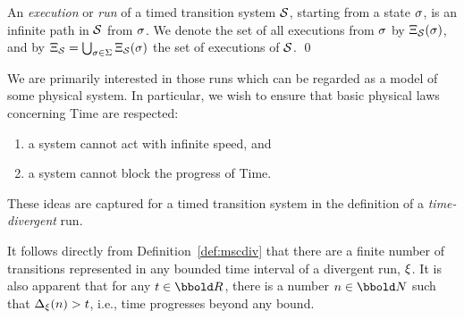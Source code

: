 {\begin{definition}
An \emph{execution} or \emph{run} of a timed transition system $\SS$,
starting from a state $\sigma$, is an infinite path in $\SS$ from
$\sigma$. We denote the set of all executions from $\sigma$ by
$\Exec_{\SS}(\state)$, and by $\Exec_{\SS} = \bigcup_{\state \in
\States} \Exec_{\SS}(\state)$ the set of executions of $\SS$.  
\qed
\end{definition}

We are primarily interested in those runs which can be regarded as a
model of some physical system. In particular, we wish to ensure that
basic physical laws concerning Time are respected:
\begin{enumerate}
\item a system cannot act with infinite speed, and 
\item a system cannot block the progress of Time.
\end{enumerate}
These ideas are captured for a timed transition system in the
definition of a \emph{time-divergent} run.


\begin{remark}\label{rem:fvar}
It follows directly from Definition~\ref{def:mscdiv} that there are a
finite number of transitions represented in any bounded time interval
of a divergent run, $\xi$. It is also apparent that for any $t \in
\Time$, there is a number $n \in \nat$ such that $\mathop{\Delta_{\xi}}(n) > t$, i.e.,
time progresses beyond any bound.
\end{remark}

}
